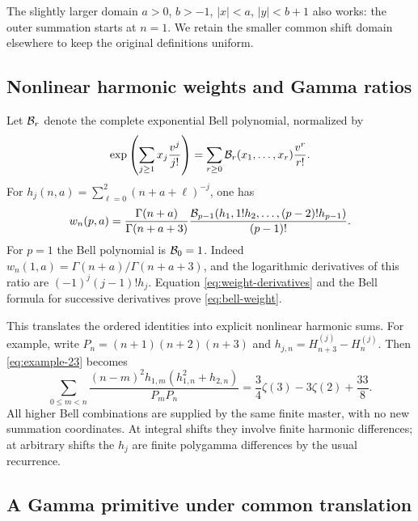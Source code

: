 The slightly larger domain $a>0$, $b>-1$, $|x|<a$, $|y|<b+1$
also works: the outer summation starts at $n=1$. We retain the
smaller common shift domain elsewhere to keep the original definitions
uniform.

\subsection{Nonlinear harmonic weights and Gamma ratios}

Let $\mathcal B_r$ denote the complete exponential Bell polynomial, normalized by
\begin{equation}\label{eq:bell-definition}
 \exp\left(\sum_{j\ge1}x_j\frac{v^j}{j!}\right)
 =\sum_{r\ge0}\mathcal B_r(x_1,\ldots,x_r)\frac{v^r}{r!}.
\end{equation}
For $h_j(n,a)=\sum_{\ell=0}^{2}(n+a+\ell)^{-j}$, one has
\begin{equation}\label{eq:bell-weight}
 w_n(p,a)=\frac{\Gamma(n+a)}{\Gamma(n+a+3)}
 \frac{\mathcal B_{p-1}(h_1,1!h_2,\ldots,(p-2)!h_{p-1})}{(p-1)!}.
\end{equation}
For $p=1$ the Bell polynomial is $\mathcal B_0=1$.
Indeed $w_n(1,a)=\Gamma(n+a)/\Gamma(n+a+3)$, and the logarithmic
derivatives of this ratio are $(-1)^j(j-1)!h_j$.
Equation \eqref{eq:weight-derivatives} and the Bell formula for
successive derivatives prove \eqref{eq:bell-weight}.

This translates the ordered identities into explicit nonlinear
harmonic sums. For example, write
$P_n=(n+1)(n+2)(n+3)$ and
$h_{j,n}=H_{n+3}^{(j)}-H_n^{(j)}$. Then \eqref{eq:example-23} becomes
\begin{equation}\label{eq:harmonic-example}
 \sum_{0\le m<n}\frac{(n-m)^2h_{1,m}(h_{1,n}^2+h_{2,n})}{P_mP_n}
 =\frac34\zeta(3)-3\zeta(2)+\frac{33}{8}.
\end{equation}
All higher Bell combinations are supplied by the same finite master,
with no new summation coordinates. At integral shifts they involve
finite harmonic differences; at arbitrary shifts the $h_j$ are
finite polygamma differences by the usual recurrence.

\subsection{A Gamma primitive under common translation}

